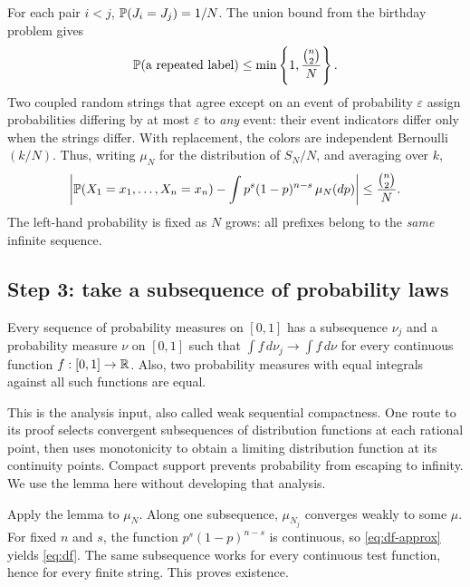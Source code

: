 For each pair $i<j$, $\P(J_i=J_j)=1/N$. The union bound from the birthday problem gives
\begin{equation}\label{eq:df-collision}
\P(\text{a repeated label})\le
\min\left\{1,\frac{\binom n2}{N}\right\}.
\end{equation}
Two coupled random strings that agree except on an event of probability $\varepsilon$ assign probabilities differing by at most $\varepsilon$ to \emph{any} event: their event indicators differ only when the strings differ. With replacement, the colors are independent Bernoulli$(k/N)$. Thus, writing $\mu_N$ for the distribution of $S_N/N$, and averaging over $k$,
\begin{equation}\label{eq:df-approx}
\left|\P(X_1=x_1,\ldots,X_n=x_n)
-\int p^s(1-p)^{n-s}\,\mu_N(dp)\right|
\le\frac{\binom n2}{N}.
\end{equation}
The left-hand probability is fixed as $N$ grows: all prefixes belong to the \emph{same} infinite sequence.

\subsection*{Step 3: take a subsequence of probability laws}
\begin{lemma}\label{lem:df-compact}
Every sequence of probability measures on $[0,1]$ has a subsequence $\nu_j$ and a probability measure $\nu$ on $[0,1]$ such that $\int f\,d\nu_j\to\int f\,d\nu$ for every continuous function $f:[0,1]\to\R$. Also, two probability measures with equal integrals against all such functions are equal.
\end{lemma}

This is the analysis input, also called weak sequential compactness. One route to its proof selects convergent subsequences of distribution functions at each rational point, then uses monotonicity to obtain a limiting distribution function at its continuity points. Compact support prevents probability from escaping to infinity. We use the lemma here without developing that analysis.

Apply the lemma to $\mu_N$. Along one subsequence, $\mu_{N_j}$ converges weakly to some $\mu$. For fixed $n$ and $s$, the function $p^s(1-p)^{n-s}$ is continuous, so \eqref{eq:df-approx} yields \eqref{eq:df}. The same subsequence works for every continuous test function, hence for every finite string. This proves existence.

